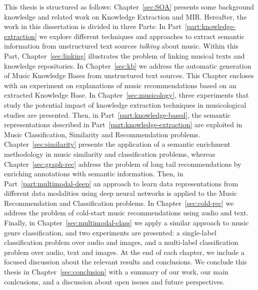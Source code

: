 This thesis is structured as follows: Chapter~\ref{sec:SOA} presents some background knowledge and related work on Knowledge Extraction and MIR. Hereafter, the work in this dissertation is divided in three Parts: In Part~\ref{part:knowledge-extraction} we explore different techniques and approaches to extract semantic information from unstructured text sources \textit{talking} about music. Within this Part, Chapter~\ref{sec:linking} illustrates the problem of linking musical texts and knowledge repositories. In Chapter~\ref{sec:kb} we address the automatic generation of Music Knowledge Bases from unstructured text sources. This Chapter encloses with an experiment on explanations of music recommendations based on an extracted Knowledge Base. In Chapter~\ref{sec:musicology}, three experiments that study the potential impact of knowledge extraction techniques in musicological studies are presented.
Then, in Part~\ref{part:knowledge-based}, the semantic representations described in Part~\ref{part:knowledge-extraction} are exploited in Music Classification, Similarity and Recommendation problems. Chapter~\ref{sec:similarity} presents the application of a semantic enrichment methodology in music similarity and classification problems, whereas Chapter~\ref{sec:graph-rec} address the problem of long tail recommendations by enriching annotations with semantic information.
Then, in Part~\ref{part:multimodal-deep} an approach to learn data representations from different data modalities using deep neural networks is applied to the Music Recommendation and Classification problems. In Chapter~\ref{sec:cold-rec} we address the problem of cold-start music recommendations using audio and text. Finally, in Chapter~\ref{sec:multimodal-class} we apply a similar approach to music genre classification, and two experiments are presented: a single-label classification problem over audio and images, and a multi-label classification problem over audio, text and images.
At the end of each chapter, we include a focused discussion about the relevant results and conclusions. We conclude this thesis in Chapter~\ref{sec:conclusion} with a summary of our work, our main conlcusions, and a discussion about open issues and future perspectives.




